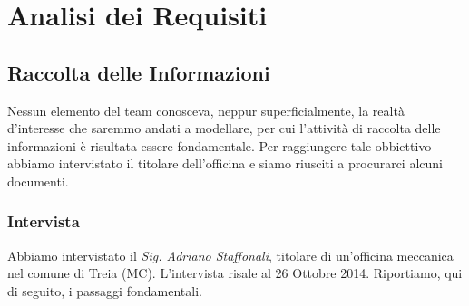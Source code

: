 \section{Analisi dei Requisiti}
	\subsection{Raccolta delle Informazioni}
	Nessun elemento del team conosceva, neppur superficialmente, la realtà d'interesse che saremmo andati a modellare, per cui l'attività di raccolta delle informazioni è risultata essere fondamentale. Per raggiungere tale obbiettivo abbiamo intervistato il titolare dell'officina e siamo riusciti a procurarci alcuni documenti.
	
		\subsubsection{Intervista}
		Abbiamo intervistato il \emph{Sig. Adriano Staffonali}, titolare di un'officina meccanica nel comune di Treia (MC). L'intervista risale al 26 Ottobre 2014. Riportiamo, qui di seguito, i passaggi fondamentali.

